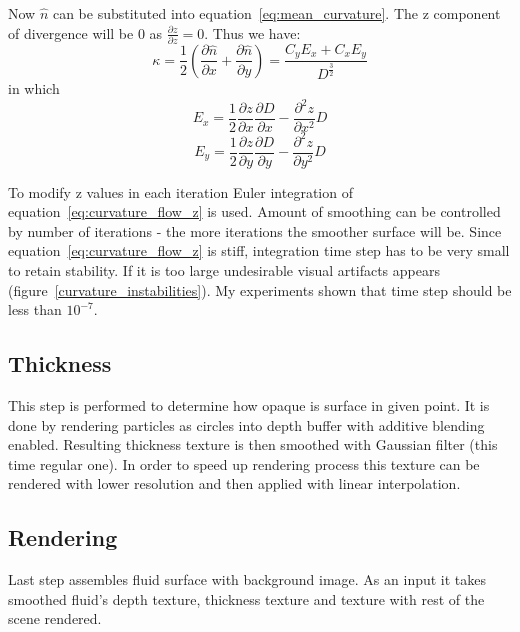 Now $\hat{n}$ can be substituted into equation~\ref{eq:mean_curvature}. The z component of divergence will be 0 as $\frac{\partial z}{\partial z} = 0$. Thus we have:
\begin{equation}
\kappa = \frac{1}{2} \left( \frac{\partial \hat{n}}{\partial x} + \frac{\partial \hat{n}}{\partial y} \right) = \frac{C_y E_x + C_x E_y}{D^{\frac{3}{2}}}
\end{equation}
in which 
\begin{equation}
E_x = \frac{1}{2} \frac{\partial z}{\partial x} \frac{\partial D}{\partial x} - \frac{\partial^2 z}{\partial x^2}D
\end{equation}
\begin{equation}
E_y = \frac{1}{2} \frac{\partial z}{\partial y} \frac{\partial D}{\partial y} - \frac{\partial^2 z}{\partial y^2}D
\end{equation}

To modify z values in each iteration Euler integration of equation~\ref{eq:curvature_flow_z} is used. Amount of smoothing can be controlled by number of iterations - the more iterations the smoother surface will be. Since equation~\ref{eq:curvature_flow_z} is stiff, integration time step has to be very small to retain stability. If it is too large undesirable visual artifacts appears (figure~\ref{curvature_instabilities}). My experiments shown that time step should be less than $10^{-7}$.

\subsection{Thickness} \label{sec:thickness}
This step is performed to determine how opaque is surface in given point. It is done by rendering particles as circles into depth buffer with additive blending enabled. Resulting thickness texture is then smoothed with Gaussian filter (this time regular one). In order to speed up rendering process this texture can be rendered with lower resolution and then applied with linear interpolation. 

\subsection{Rendering} \label{sec:screenspace_rendering}
Last step assembles fluid surface with background image. As an input it takes smoothed fluid's depth texture, thickness texture and texture with rest of the scene rendered. 


